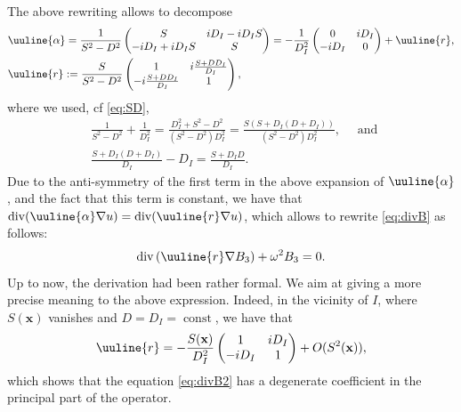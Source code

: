 \documentclass[report]{elsarticle}
\numberwithin{theorem}{section}
\renewcommand{\vec}[1]{\mathbf{#1}}
\begin{document}
The above rewriting allows to decompose
\begin{align*}
&\uuline{\alpha}=\frac{1}{S^2-D^2}
\left(
\begin{matrix}
S & iD_I-iD_IS\\
	-iD_I+iD_IS & S
\end{matrix}
\right)=
-\frac{1}{D_I^2}\left(
\begin{matrix}
	0 & iD_I\\
	-iD_I & 0
\end{matrix}
\right)+\uuline{r}, \\ &\uuline{r}:=\frac{S}{S^2-D^2}\left(
\begin{matrix}  
1 & i\frac{S+DD_I}{D_I}\\
-i\frac{S+DD_I}{D_I} & 1
\end{matrix}
\right),
\end{align*}
where we used, cf \eqref{eq:SD}, 
\begin{align*}
&\frac{1}{S^2-D^2}+\frac{1}{D_I^2}=	\frac{D_I^2+S^2-D^2}{(S^2-D^2)D_I^2}=\frac{S(S+D_I(D+D_I))}{(S^2-D^2)D_I^2}, \quad \text{ and  }\\
&\frac{S+D_I(D+D_I)}{D_I}-D_I=\frac{S+D_I D}{D_I}.
\end{align*}
Due to the anti-symmetry of the first term in the above expansion of $\uuline{\alpha}$, and the fact that this term is constant, we have that $\operatorname{div}(\uuline{\alpha}\nabla u)=\operatorname{div}(\uuline{r}\nabla u)$, which allows to rewrite  \eqref{eq:divB} as follows: 
\begin{align}
	\label{eq:divB2}
	\operatorname{div}\left(\uuline{r}\nabla B_3\right)+\omega^2 B_3=0.
\end{align}
Up to now, the derivation had been rather formal. We aim at giving a more precise meaning to the above expression. Indeed, in the vicinity of $I$, where $S(\vec{x})$ vanishes and $D=D_I=\operatorname{const}$, we have that 
\begin{align*}
	\uuline{r}=-\frac{S(\vec{x})}{D^2_I}\left(
	\begin{matrix}  
		1 & iD_I\\
		-iD_I& 1
	\end{matrix}
	\right)+O(S^2(\vec{x})),
\end{align*}
which shows that the equation \eqref{eq:divB2} has a degenerate coefficient in the principal part of the operator.
\end{document}
